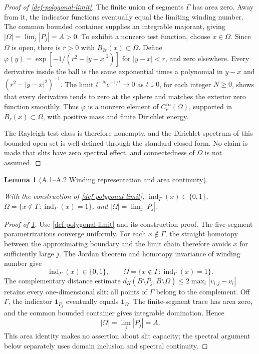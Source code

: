 \documentclass[11pt,a4paper]{article}
\theoremstyle{proofmanuscript}
\newtheorem{lemma}[theorem]{Lemma}
\begin{document}
\begin{proof}[Proof of \ref{def-polygonal-limit}]
The finite union of segments \(\Gamma\) has area zero. Away from it, the indicator functions eventually equal the limiting winding number. The common bounded container supplies an integrable majorant, giving \(|\Omega|=\lim_j|P_j|=A>0\). To exhibit a nonzero test function, choose \(x\in\Omega\). Since \(\Omega\) is open, there is \(r>0\) with \(B_{2r}(x)\subset\Omega\). Define \(\varphi(y)=\exp[-1/(r^2-|y-x|^2)]\) for \(|y-x|<r\), and zero elsewhere. Every derivative inside the ball is the same exponential times a polynomial in \(y-x\) and \((r^2-|y-x|^2)^{-1}\). The limit \(t^{-N}e^{-1/t}\to0\) as \(t\downarrow0\), for each integer \(N\ge0\), shows that every derivative tends to zero at the sphere and matches the exterior zero function smoothly. Thus \(\varphi\) is a nonzero element of \(C_c^\infty(\Omega)\), supported in \(\overline B_r(x)\subset\Omega\), with positive mass and finite Dirichlet energy.

The Rayleigh test class is therefore nonempty, and the Dirichlet spectrum of this bounded open set is well defined through the standard closed form. No claim is made that slits have zero spectral effect, and connectedness of \(\Omega\) is not assumed.

\end{proof}

\begin{lemma}[A.1--A.2 Winding representation and area continuity]\label{lem-limit-winding-area}

With the construction of \ref{def-polygonal-limit}, \(\operatorname{ind}_\Gamma(x)\in\{0,1\}\), \(\Omega=\{x\notin\Gamma:\operatorname{ind}_\Gamma(x)=1\}\), and \(|\Omega|=\lim_j|P_j|\).

\end{lemma}

\begin{proof}[Proof of \ref{lem-limit-winding-area}]

Use \ref{def-polygonal-limit} and its construction proof. The five-segment parametrizations converge uniformly. For each \(x\notin\Gamma\), the straight homotopy between the approximating boundary and the limit chain therefore avoids \(x\) for sufficiently large \(j\). The Jordan theorem and homotopy invariance of winding number give \[
\operatorname{ind}_\Gamma(x)\in\{0,1\},\qquad
\Omega=\{x\notin\Gamma:\operatorname{ind}_\Gamma(x)=1\}.
\tag{A.1}
\] The complementary distance estimate \(d_H(B\setminus P_j,B\setminus\Omega)\le2\max_i|v_{i,j}-v_i|\) retains every one-dimensional slit: all points of \(\Gamma\) belong to the complement. Off \(\Gamma\), the indicator \(\mathbf1_{P_j}\) eventually equals \(\mathbf1_\Omega\). The finite-segment trace has area zero, and the common bounded container gives integrable domination. Hence \[
|\Omega|=\lim_j|P_j|=A.\tag{A.2}
\] This area identity makes no assertion about slit capacity; the spectral argument below separately uses domain inclusion and spectral continuity.

\end{proof}
\end{document}
